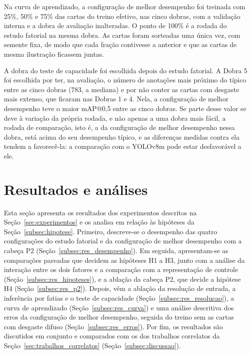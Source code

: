 \documentclass[
    12pt,                %
    openright,           %
    oneside,             %
    a4paper,             %
    english,             %
    brazil               %
]{abntex2}
\begin{document}
Na curva de aprendizado, a configuração de melhor desempenho foi
treinada com 25\%, 50\% e 75\% das cartas do treino efetivo, nas
cinco dobras, com a validação interna e a dobra de avaliação
inalteradas. O ponto de 100\% é a rodada do estudo fatorial na mesma
dobra. As cartas foram sorteadas uma única vez, com semente fixa, de
modo que cada fração contivesse a anterior e que as cartas de mesma
ilustração ficassem juntas.

A dobra do teste de capacidade foi escolhida depois do estudo fatorial. A
Dobra 5 foi escolhida por ter, na avaliação, o número de anotações mais
próximo do típico entre as cinco dobras (783, a mediana) e por não
conter as cartas com desgaste mais extenso, que ficaram nas Dobras 1 e
4. Nela, a configuração de melhor desempenho teve o maior mAP@0,5 entre
as cinco dobras. Se parte desse valor se deve à variação da própria
rodada, e não apenas a uma dobra mais fácil, a rodada de comparação,
isto é, a da configuração de melhor desempenho nessa dobra, está acima do seu desempenho típico, e as diferenças medidas contra ela
tendem a favorecê-la: a comparação com o YOLOv8m pode estar
desfavorável a ele.

\section{Resultados e análises}
\label{sec:resultados}

Esta seção apresenta os resultados dos experimentos descritos na
Seção~\ref{sec:experimentos} e os analisa em relação às hipóteses da
Seção~\ref{subsec:hipotese}. Primeiro, descreve-se o desempenho das quatro
configurações do estudo fatorial e da configuração de melhor desempenho com
a cabeça P2 (Seção~\ref{subsec:res_desempenho}). Em seguida, apresentam-se
as comparações pareadas que decidem as hipóteses H1 a H3, junto com a
análise da interação entre os dois fatores e a comparação com a
representação de controle
(Seção~\ref{subsec:res_hipoteses}), e a ablação da cabeça P2, que decide a
hipótese H4 (Seção~\ref{subsec:res_p2}). Depois, vêm a ablação da resolução
de entrada, a inferência por fatias e o teste de capacidade
(Seção~\ref{subsec:res_resolucao}), a
curva de aprendizado (Seção~\ref{subsec:res_curva}) e uma análise
descritiva dos erros da configuração de melhor desempenho, seguida do
treino sem as cartas com desgaste difuso
(Seção~\ref{subsec:res_erros}). Por fim, os resultados são discutidos em
conjunto e comparados com os dos trabalhos correlatos da
Seção~\ref{sec:trabalhos_correlatos} (Seção~\ref{subsec:discussao}).
\end{document}
